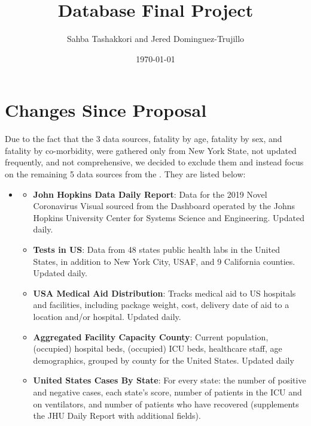 \documentclass[11pt]{article}
\newcommand{\MYhref}[3][blue]{\href{#2}{\color{#1}{#3}}}%
\begin{document}
\title{Database Final Project}
\date{\today}
\author{Sahba Tashakkori and Jered Dominguez-Trujillo}

\maketitle
{}
\begin{center}
\end{center}
\newpage
\tableofcontents
{}

\pagebreak

\section{Changes Since Proposal}
\noindent
Due to the fact that the 3 data sources, fatality by age, fatality by sex, and fatality by co-morbidity, were gathered only from New York State, not updated frequently, and not comprehensive, we decided to exclude them and instead focus on the remaining 5 data sources from the  \MYhref{https://www.npmjs.com/package/covid19-api}{Covid-19 API}. They are listed below:

\begin{itemize}
    \item \MYhref{https://www.npmjs.com/package/covid19-api}{Covid-19 API}
        \begin{itemize}
        \item \textbf{John Hopkins Data Daily Report}: Data for the 2019 Novel Coronavirus Visual sourced from the Dashboard operated by the Johns Hopkins University Center for Systems Science and Engineering. Updated daily.
        \item \textbf{Tests in US}: Data from 48 states public health labs in the United States, in addition to New York City, USAF, and 9 California counties. Updated daily.
        \item \textbf{USA Medical Aid Distribution}: Tracks medical aid to US hospitals and facilities, including package weight, cost, delivery date of aid to a location and/or hospital. Updated daily.
        \item \textbf{Aggregated Facility Capacity County}: Current population, (occupied) hospital beds, (occupied) ICU beds, healthcare staff, age demographics, grouped by county for the United States. Updated daily 
        \item \textbf{United States Cases By State}: For every state: the number of positive and negative cases, each state's score, number of patients in the ICU and on ventilators, and number of patients who have recovered (supplements the JHU Daily Report with additional fields).
    \end{itemize} 
\end{itemize}
\end{document}
